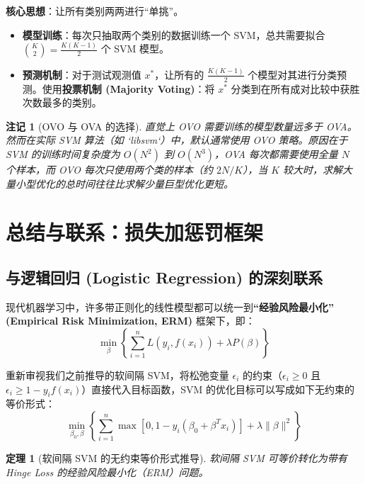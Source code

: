 \documentclass[UTF8]{ctexart}
\newtheorem{theorem}{定理}[section]
\newtheorem{remark}{注记}[section]
\numberwithin{equation}{section}
\begin{document}
\textbf{核心思想}：让所有类别两两进行“单挑”。
\begin{itemize}
    \item \textbf{模型训练}：每次只抽取两个类别的数据训练一个 SVM，总共需要拟合 $\binom{K}{2} = \frac{K(K-1)}{2}$ 个 SVM 模型。
    \item \textbf{预测机制}：对于测试观测值 $x^*$，让所有的 $\frac{K(K-1)}{2}$ 个模型对其进行分类预测。使用\textbf{投票机制 (Majority Voting)}：将 $x^*$ 分类到在所有成对比较中获胜次数最多的类别。
\end{itemize}

\begin{remark}[OVO 与 OVA 的选择]
直觉上 OVO 需要训练的模型数量远多于 OVA。然而在实际 SVM 算法（如 `libsvm`）中，默认通常使用 OVO 策略。原因在于 SVM 的训练时间复杂度为 $O(N^2)$ 到 $O(N^3)$，OVA 每次都需要使用全量 $N$ 个样本，而 OVO 每次只使用两个类的样本（约 $2N/K$），当 $K$ 较大时，求解大量小型优化的总时间往往比求解少量巨型优化更短。
\end{remark}

\vspace{2em}

\section{总结与联系：损失加惩罚框架}

\subsection{与逻辑回归 (Logistic Regression) 的深刻联系}

现代机器学习中，许多带正则化的线性模型都可以统一到\textbf{“经验风险最小化” (Empirical Risk Minimization, ERM)} 框架下，即：
$$ \min_{\beta} \left\{ \sum_{i=1}^n L(y_i, f(x_i)) + \lambda P(\beta) \right\} $$

重新审视我们之前推导的软间隔 SVM，将松弛变量 $\epsilon_i$ 的约束（$\epsilon_i \ge 0$ 且 $\epsilon_i \ge 1 - y_i f(x_i)$）直接代入目标函数，SVM 的优化目标可以写成如下无约束的等价形式：
\begin{equation}
    \min_{\beta_0, \beta} \left\{ \sum_{i=1}^n \max[0, 1 - y_i(\beta_0 + \beta^T x_i)] + \lambda \|\beta\|^2 \right\}
\end{equation}

\begin{theorem}[软间隔 SVM 的无约束等价形式推导]
软间隔 SVM 可等价转化为带有 Hinge Loss 的经验风险最小化（ERM）问题。
\end{theorem}
\end{document}
